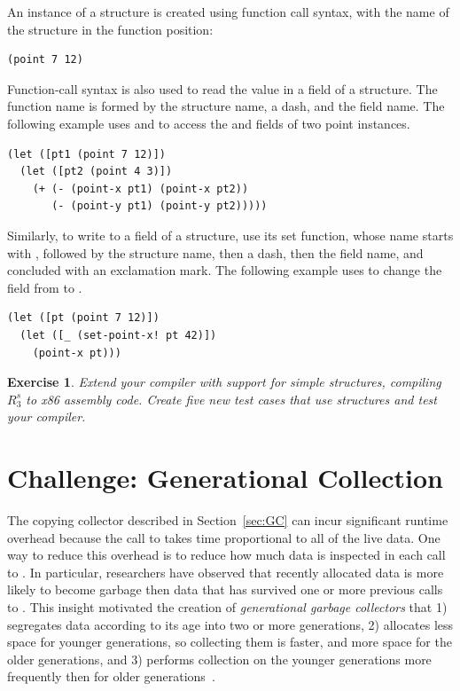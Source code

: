 \documentclass[11pt]{book}
\newtheorem{exercise}[theorem]{Exercise}
\begin{document}
An instance of a structure is created using function call syntax, with
the name of the structure in the function position:
\begin{lstlisting}
(point 7 12)
\end{lstlisting}
Function-call syntax is also used to read the value in a field of a
structure. The function name is formed by the structure name, a dash,
and the field name. The following example uses  and
 to access the  and  fields of two point
instances.
\begin{center}
\begin{lstlisting}
(let ([pt1 (point 7 12)])
  (let ([pt2 (point 4 3)])
    (+ (- (point-x pt1) (point-x pt2))
       (- (point-y pt1) (point-y pt2)))))
\end{lstlisting}
\end{center}
Similarly, to write to a field of a structure, use its set function,
whose name starts with , followed by the structure name,
then a dash, then the field name, and concluded with an exclamation
mark. The following example uses  to change the
 field from  to .
\begin{center}
  \begin{lstlisting}
(let ([pt (point 7 12)])
  (let ([_ (set-point-x! pt 42)])
    (point-x pt)))
\end{lstlisting}
\end{center}

\begin{exercise}\normalfont
  Extend your compiler with support for simple structures, compiling
  $R^s_3$ to x86 assembly code. Create five new test cases that use
  structures and test your compiler.
\end{exercise}


\section{Challenge: Generational Collection}

The copying collector described in Section~\ref{sec:GC} can incur
significant runtime overhead because the call to  takes
time proportional to all of the live data. One way to reduce this
overhead is to reduce how much data is inspected in each call to
. In particular, researchers have observed that recently
allocated data is more likely to become garbage then data that has
survived one or more previous calls to . This insight
motivated the creation of \emph{generational garbage collectors}
 that
1) segregates data according to its age into two or more generations,
2) allocates less space for younger generations, so collecting them is
faster, and more space for the older generations, and 3) performs
collection on the younger generations more frequently then for older
generations~\citep{Wilson:1992fk}.
\end{document}
